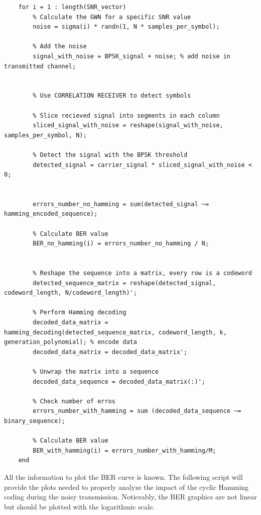\begin{lstlisting}
    for i = 1 : length(SNR_vector)
        % Calculate the GWN for a specific SNR value
        noise = sigma(i) * randn(1, N * samples_per_symbol);

        % Add the noise
        signal_with_noise = BPSK_signal + noise; % add noise in transmitted channel;


        % Use CORRELATION RECEIVER to detect symbols

        % Slice recieved signal into segments in each column
        sliced_signal_with_noise = reshape(signal_with_noise, samples_per_symbol, N);

        % Detect the signal with the BPSK threshold
        detected_signal = carrier_signal * sliced_signal_with_noise < 0;

        
        errors_number_no_hamming = sum(detected_signal ~= hamming_encoded_sequence);

        % Calculate BER value
        BER_no_hamming(i) = errors_number_no_hamming / N;
        

        % Reshape the sequence into a matrix, every row is a codeword
        detected_sequence_matrix = reshape(detected_signal, codeword_length, N/codeword_length)';
        
        % Perform Hamming decoding
        decoded_data_matrix = hamming_decoding(detected_sequence_matrix, codeword_length, k, generation_polynomial); % encode data
        decoded_data_matrix = decoded_data_matrix';

        % Unwrap the matrix into a sequence
        decoded_data_sequence = decoded_data_matrix(:)'; 

        % Check number of erros
        errors_number_with_hamming = sum (decoded_data_sequence ~= binary_sequence);

        % Calculate BER value
        BER_with_hamming(i) = errors_number_with_hamming/M;
    end
\end{lstlisting}

\noindent All the information to plot the BER curve is known. The following script will provide the plots needed to properly analyze the impact of the cyclic Hamming coding during the noisy transmission. Noticeably, the BER graphics are not linear but should be plotted with the logarithmic scale.

